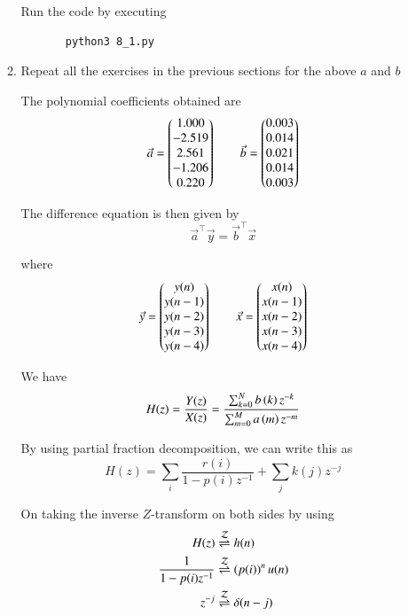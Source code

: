 \documentclass[journal,12pt,twocolumn]{IEEEtran}
\renewcommand\thesection{\arabic{section}}
\begin{document}
\begin{enumerate}[label=\thesection.\arabic*]
\begin{enumerate}[label=\thesection.\arabic*]
     Run the code by executing
     \begin{lstlisting}
       python3 8_1.py
     \end{lstlisting}
     
     \item Repeat all the exercises in the previous sections for the above $a$ and $b$
     
     \solution The polynomial coefficients obtained are
     \begin{align}
       \vec{a} = \begin{pmatrix}1.000 \\ -2.519 \\ 2.561 \\ -1.206 \\ 0.220\end{pmatrix} \qquad
       \vec{b} = \begin{pmatrix}0.003 \\ 0.014 \\ 0.021 \\ 0.014 \\ 0.003\end{pmatrix}
     \end{align}
     
     The difference equation is then given by
     \begin{equation}
       \vec{a}^\top \vec{y} = \vec{b}^\top \vec{x} 
     \end{equation}
     
     where
     \begin{align}
       \vec{y} = \begin{pmatrix}y(n) \\ y(n-1) \\ y(n-2) \\ y(n-3) \\ y(n-4)\end{pmatrix} \qquad
       \vec{x} = \begin{pmatrix}x(n) \\ x(n-1) \\ x(n-2) \\ x(n-3) \\ x(n-4)\end{pmatrix}
     \end{align}
     
     We have
     \begin{equation}
       H(z) = \frac{Y(z)}{X(z)} = \frac{\sum _{k=0}^{N}b\left(k\right) z^{-k}}{\sum _{m=0}^{M}a\left(m\right) z^{-m}}
     \end{equation}
     
     By using partial fraction decomposition, we can write this as
     \begin{equation}
       H(z) = \sum_i \frac{r(i)}{1-p(i)z^{-1}} + \sum_j k(j)z^{-j}
     \end{equation}
     
     On taking the inverse $Z$-transform on both sides by using 
     \begin{align}
       H(z) &\overset{\mathcal{Z}}{ \rightleftharpoons} h(n) \\
       \frac{1}{1-p(i)z^{-1}} &\overset{\mathcal{Z}}{ \rightleftharpoons} \left(p(i)\right)^nu(n) \\
       z^{-j} &\overset{\mathcal{Z}}{ \rightleftharpoons} \delta(n-j) 
     \end{align}
     

\end{enumerate}
\end{enumerate}
\end{document}
